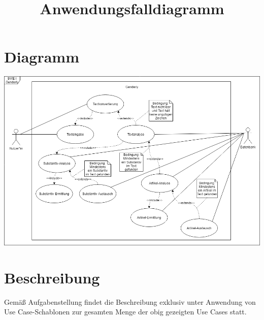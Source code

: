 \documentclass[paper=a4, parskip=half]{scrreprt}
\begin{document}
\title{Anwendungsfalldiagramm} %





\chapter{Diagramm}
\begin{adjustbox}{center,caption=
		{UML-Anwendungsfalldiagramm}
		,label={UML-Anwendungsfalldiagramm} ,nofloat=figure,vspace=\bigskipamount}
	\includegraphics[width=\textwidth]{Bilder/Diagramme/Anwendungsfalldiagramm.png}
\end{adjustbox}
\vspace{0.25cm}

\chapter{Beschreibung}

\vspace{0.25cm}

Gemäß Aufgabenstellung findet die Beschreibung exklusiv unter Anwendung von Use Case-Schablonen zur gesamten Menge der obig gezeigten Use Cases statt.

\vspace{1cm}
\end{document}
